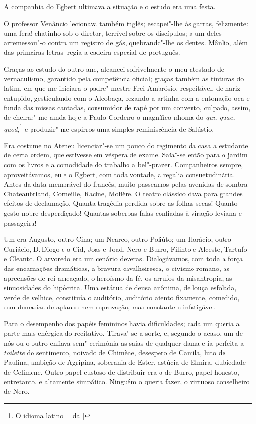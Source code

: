 A companhia do Egbert ultimava a situação e o estudo era uma festa. 

O professor Venâncio
lecionava também inglês; escapei"-lhe às garras, felizmente: uma fera!
chatinho sob o diretor, terrível sobre os discípulos; a um deles
arremessou"-o contra um registro de gás, quebrando"-lhe os dentes.
Mânlio, além das primeiras letras, regia a cadeira especial de
português. 

Graças ao estudo do outro ano, alcancei sofrivelmente o meu
atestado de vernaculismo, garantido pela competência oficial; graças
também às tinturas do latim, em que me iniciara o padre"-mestre Frei
Ambrósio, respeitável, de nariz entupido, gesticulando com o Alcobaça,
rezando a artinha com a entonação oca e funda das missas cantadas,
consumidor de rapé por um convento, culpado, assim, de cheirar"-me
ainda hoje a Paulo Cordeiro o magnífico idioma do \textit{qui, quae, quod},\footnote{ O idioma 
latino. [~da ]} e produzir"-me espirros uma simples reminiscência de Salústio. 

Era costume no Ateneu licenciar"-se um pouco do regimento da casa a
estudante de certa ordem, que estivesse em véspera de exame. Saía"-se
então para o jardim com os livros e a comodidade do trabalho a
bel"-prazer. Companheiros sempre, aproveitávamos, eu e o Egbert, com
toda vontade, a regalia consuetudinária. Antes da data memorável do
francês, muito passeamos pelas avenidas de sombra Chateaubriand,
Corneille, Racine, Molière. O teatro clássico dava para grandes efeitos
de declamação. Quanta tragédia perdida sobre as folhas secas! Quanto
gesto nobre desperdiçado! Quantas soberbas falas confiadas à viração
leviana e passageira! 

Um era Augusto, outro Cina; um Nearco, outro
Poliúto; um Horácio, outro Curiácio, D.\,Diogo e o Cid, Joas e Joad,
Nero e Burro, Filinto e Alceste, Tartufo e Cleanto. O arvoredo era um
cenário deveras. Dialogávamos, com toda a força das encarnações
dramáticas, a bravura cavalheiresca, o civismo romano, as apreensões de
rei ameaçado, o heroísmo da fé, os arrufos da misantropia, as
sinuosidades do hipócrita. Uma estátua de deusa anônima, de louça
esfolada, verde de velhice, constituía o auditório, auditório atento
fixamente, comedido, sem demasias de aplauso nem reprovação, mas
constante e infatigável. 

Para o desempenho dos papéis femininos havia
dificuldades; cada um queria a parte mais enérgica do recitativo.
Tirava"-se a sorte, e, segundo o acaso, um de nós ou o outro enfiava
sem"-cerimônia as saias de qualquer dama e ia perfeita a \textit{toilette} do
sentimento, noivado de Chimène, desespero de Camila, luto de Paulina,
ambição de Agripina, soberania de Ester, astúcia de Elmira, dubiedade
de Celimene. Outro papel custoso de distribuir era o de Burro, papel
honesto, entretanto, e altamente simpático. Ninguém o queria fazer, o
virtuoso conselheiro de Nero. 

